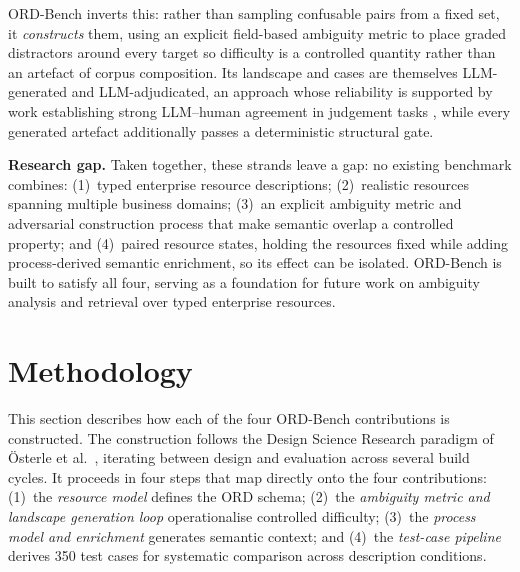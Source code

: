 \documentclass[10pt,twocolumn]{article}
\begin{document}
ORD-Bench inverts this: rather than sampling confusable pairs from a fixed set, it \emph{constructs} them, using an explicit field-based ambiguity metric to place graded distractors around every target so difficulty is a controlled quantity rather than an artefact of corpus composition. Its landscape and cases are themselves LLM-generated and LLM-adjudicated, an approach whose reliability is supported by work establishing strong LLM--human agreement in judgement tasks \citep{zheng_judging_2023}, while every generated artefact additionally passes a deterministic structural gate.

\textbf{Research gap.}
Taken together, these strands leave a gap: no existing benchmark combines: (1)~typed enterprise resource descriptions; (2)~realistic resources spanning multiple business domains; (3)~an explicit ambiguity metric and adversarial construction process that make semantic overlap a controlled property; and (4)~paired resource states, holding the resources fixed while adding process-derived semantic enrichment, so its effect can be isolated. ORD-Bench is built to satisfy all four, serving as a foundation for future work on ambiguity analysis and retrieval over typed enterprise resources.





\section{Methodology}
\label{sec:design}

This section describes how each of the four ORD-Bench contributions is constructed. The construction follows the Design Science Research paradigm of Österle et al.\ \citep{osterle2010}, iterating between design and evaluation across several build cycles. It proceeds in four steps that map directly onto the four contributions: (1)~the \emph{resource model} defines the ORD schema; (2)~the \emph{ambiguity metric and landscape generation loop} operationalise controlled difficulty; (3)~the \emph{process model and enrichment} generates semantic context; and (4)~the \emph{test-case pipeline} derives 350 test cases for systematic comparison across description conditions.
\end{document}

